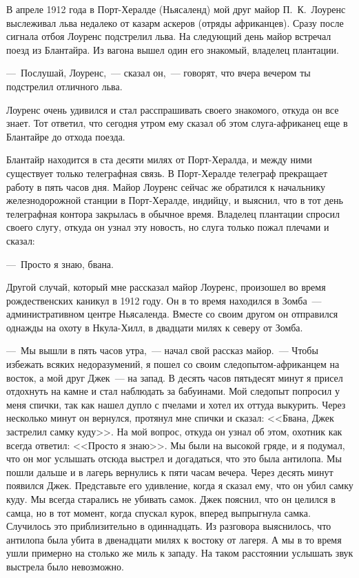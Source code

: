 \documentclass[12pt,a4paper,twoside,openany,svgnames]{memoir}
\begin{document}
В апреле 1912 года в Порт-Хералде (Ньясаленд) мой друг майор П.~К.~Лоуренс выслеживал льва недалеко от казарм аскеров (отряды африканцев). Сразу после сигнала отбоя Лоуренс подстрелил льва. На следующий день майор встречал поезд из Блантайра. Из вагона вышел один его знакомый, владелец плантации.

---~Послушай, Лоуренс,~--- сказал он,~--- говорят, что вчера вечером ты подстрелил отличного льва.

Лоуренс очень удивился и стал расспрашивать своего знакомого, откуда он все знает. Тот ответил, что сегодня утром ему сказал об этом слуга-африканец еще в Блантайре до отхода поезда.

Блантайр находится в ста десяти милях от Порт-Хералда, и между ними существует только телеграфная связь. В Порт-Хералде телеграф прекращает работу в пять часов дня. Майор Лоуренс сейчас же обратился к начальнику железнодорожной станции в Порт-Хералде, индийцу, и выяснил, что в тот день телеграфная контора закрылась в обычное время. Владелец плантации спросил своего слугу, откуда он узнал эту новость, но слуга только пожал плечами и сказал:

---~Просто я знаю, бвана.

Другой случай, который мне рассказал майор Лоуренс, произошел во время рождественских каникул в 1912 году. Он в то время находился в Зомба~--- административном центре Ньясаленда. Вместе со своим другом он отправился однажды на охоту в Нкула-Хилл, в двадцати милях к северу от Зомба.

---~Мы вышли в пять часов утра,~--- начал свой рассказ майор.~--- Чтобы избежать всяких недоразумений, я пошел со своим следопытом-африканцем на восток, а мой друг Джек~--- на запад. В десять часов пятьдесят минут я присел отдохнуть на камне и стал наблюдать за бабуинами. Мой следопыт попросил у меня спички, так как нашел дупло с пчелами и хотел их оттуда выкурить. Через несколько минут он вернулся, протянул мне спички и сказал: <<Бвана, Джек застрелил самку куду>>. На мой вопрос, откуда он узнал об этом, охотник как всегда ответил: <<Просто я знаю>>. Мы были на высокой гряде, и я подумал, что он мог услышать отсюда выстрел и догадаться, что это была антилопа. Мы пошли дальше и в лагерь вернулись к пяти часам вечера. Через десять минут появился Джек. Представьте его удивление, когда я сказал ему, что он убил самку куду. Мы всегда старались не убивать самок. Джек пояснил, что он целился в самца, но в тот момент, когда спускал курок, вперед выпрыгнула самка. Случилось это приблизительно в одиннадцать. Из разговора выяснилось, что антилопа была убита в двенадцати милях к востоку от лагеря. А мы в то время ушли примерно на столько же миль к западу. На таком расстоянии услышать звук выстрела было невозможно.
\end{document}
